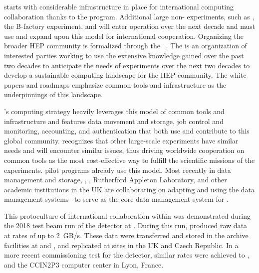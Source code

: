  starts with considerable infrastructure in place for international computing collaboration thanks to the  program.  Additional large non- experiments, 
such as , the  B-factory experiment, and   will enter operation over the next decade and must use and expand upon this model for international cooperation.  Organizing the broader HEP community is formalized through the ~\cite{Alves:2017she}.  The  is an organization of interested parties working to use the extensive knowledge gained over the past two decades to %
anticipate the needs of experiments %
over the next two decades to develop a sustainable computing landscape for the HEP community.  The  white papers and roadmaps emphasize common tools and infrastructure as the underpinnings of this landscape.

's computing strategy heavily leverages this model of common tools and infrastructure and features data movement and storage, job control and monitoring, accounting, and authentication that both use and contribute to this global community.    recognizes that other large-scale experiments have similar needs and will encounter similar issues, thus driving worldwide cooperation on common tools as the most cost-effective way to fulfill the scientific missions of the experiments.   pilot programs already use this model.  Most recently in data management and storage, , , Rutherford Appleton Laboratory, and other academic institutions in the %
UK are collaborating on adapting and using the  data management systems~\cite{Barisits:2019fyl}  to serve as the core data management system for .

This protoculture of international collaboration within  %
was demonstrated during the 2018 test beam run of the  detector  at .  During this run, %
 produced raw data at rates of up to \SI{2}{GB/s}.  These data were transferred and stored in the archive facilities at  and , and replicated at sites in the UK and Czech Republic.  In a more recent commissioning test for the  detector, similar rates %
were achieved to ,  and the CCIN2P3 computer center in Lyon, France.

